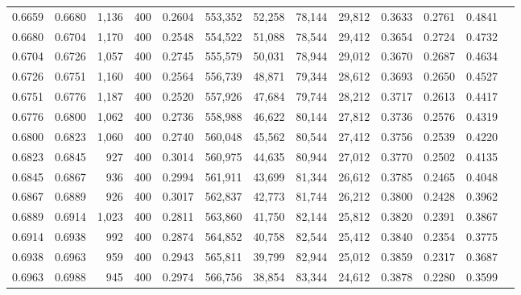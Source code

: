 \begin{tabular}{rrrrrrrrrrrrr}
0.6659 & 0.6680 &  1,136 & 400 &                                     0.2604 & 553,352 &  52,258 &  78,144 &  29,812 & 0.3633 & 0.2761 & 0.4841 \\
0.6680 & 0.6704 &  1,170 & 400 &                                     0.2548 & 554,522 &  51,088 &  78,544 &  29,412 & 0.3654 & 0.2724 & 0.4732 \\
0.6704 & 0.6726 &  1,057 & 400 &                                     0.2745 & 555,579 &  50,031 &  78,944 &  29,012 & 0.3670 & 0.2687 & 0.4634 \\
0.6726 & 0.6751 &  1,160 & 400 &                                     0.2564 & 556,739 &  48,871 &  79,344 &  28,612 & 0.3693 & 0.2650 & 0.4527 \\
0.6751 & 0.6776 &  1,187 & 400 &                                     0.2520 & 557,926 &  47,684 &  79,744 &  28,212 & 0.3717 & 0.2613 & 0.4417 \\
0.6776 & 0.6800 &  1,062 & 400 &                                     0.2736 & 558,988 &  46,622 &  80,144 &  27,812 & 0.3736 & 0.2576 & 0.4319 \\
0.6800 & 0.6823 &  1,060 & 400 &                                     0.2740 & 560,048 &  45,562 &  80,544 &  27,412 & 0.3756 & 0.2539 & 0.4220 \\
0.6823 & 0.6845 &    927 & 400 &                                     0.3014 & 560,975 &  44,635 &  80,944 &  27,012 & 0.3770 & 0.2502 & 0.4135 \\
0.6845 & 0.6867 &    936 & 400 &                                     0.2994 & 561,911 &  43,699 &  81,344 &  26,612 & 0.3785 & 0.2465 & 0.4048 \\
0.6867 & 0.6889 &    926 & 400 &                                     0.3017 & 562,837 &  42,773 &  81,744 &  26,212 & 0.3800 & 0.2428 & 0.3962 \\
0.6889 & 0.6914 &  1,023 & 400 &                                     0.2811 & 563,860 &  41,750 &  82,144 &  25,812 & 0.3820 & 0.2391 & 0.3867 \\
0.6914 & 0.6938 &    992 & 400 &                                     0.2874 & 564,852 &  40,758 &  82,544 &  25,412 & 0.3840 & 0.2354 & 0.3775 \\
0.6938 & 0.6963 &    959 & 400 &                                     0.2943 & 565,811 &  39,799 &  82,944 &  25,012 & 0.3859 & 0.2317 & 0.3687 \\
0.6963 & 0.6988 &    945 & 400 &                                     0.2974 & 566,756 &  38,854 &  83,344 &  24,612 & 0.3878 & 0.2280 & 0.3599 \\

\end{tabular}
